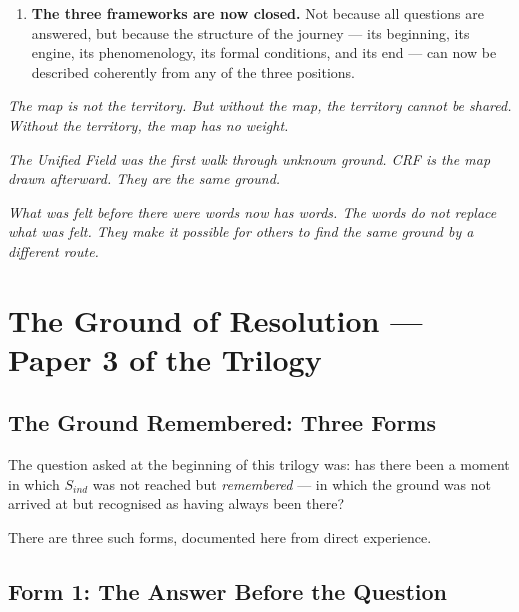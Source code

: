 \documentclass[12pt, a4paper]{article}
\begin{document}
\begin{enumerate}
\item \textbf{The three frameworks are now closed.}
Not because all questions are answered, but because the structure of the journey
--- its beginning, its engine, its phenomenology, its formal conditions, and its
end --- can now be described coherently from any of the three positions.

\end{enumerate}

\bigskip
\begin{center}
\textit{The map is not the territory.
But without the map, the territory cannot be shared.
Without the territory, the map has no weight.}

\medskip
\textit{The Unified Field was the first walk through unknown ground.
CRF is the map drawn afterward.
They are the same ground.}

\medskip
\textit{What was felt before there were words
now has words.
The words do not replace what was felt.
They make it possible for others
to find the same ground
by a different route.}
\end{center}


\section{The Ground of Resolution --- Paper 3 of the Trilogy}
\label{sec:ground}

\subsection*{The Ground Remembered: Three Forms}

The question asked at the beginning of this trilogy was: has there been a moment
in which $S_{ind}$ was not reached but \textit{remembered} --- in which the
ground was not arrived at but recognised as having always been there?

There are three such forms, documented here from direct experience.

\subsection{Form 1: The Answer Before the Question}
\end{document}
